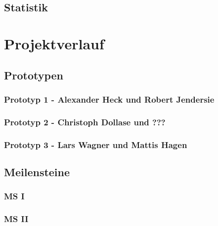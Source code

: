 \documentclass{article}
\begin{document}
\vspace{2cm}
\subsection{Statistik}


\newpage
\section{Projektverlauf}

\vspace{2cm}
\subsection{Prototypen}

\vspace{1cm}
\subsubsection{Prototyp 1 - Alexander Heck und Robert Jendersie}

\vspace{1cm}
\subsubsection{Prototyp 2 - Christoph Dollase und ???}

\vspace{1cm}
\subsubsection{Prototyp 3 - Lars Wagner und Mattis Hagen}

\vspace{2cm}
\subsection{Meilensteine}

\vspace{1cm}
\subsubsection{MS I}

\vspace{1cm}
\subsubsection{MS II}

\vspace{1cm}
\end{document}
